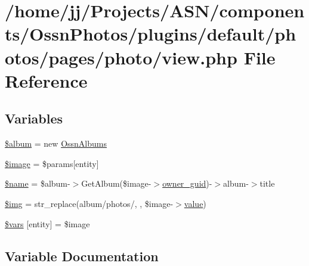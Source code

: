 \hypertarget{components_2_ossn_photos_2plugins_2default_2photos_2pages_2photo_2view_8php}{}\section{/home/jj/\+Projects/\+A\+S\+N/components/\+Ossn\+Photos/plugins/default/photos/pages/photo/view.php File Reference}
\label{components_2_ossn_photos_2plugins_2default_2photos_2pages_2photo_2view_8php}
\subsection*{Variables}
\begin{DoxyCompactItemize}
\item 
\hyperlink{components_2_ossn_photos_2plugins_2default_2photos_2pages_2photo_2view_8php_ac40a9764673b6d86593dc674331c5116}{\$album} = new \hyperlink{class_ossn_albums}{Ossn\+Albums}
\item 
\hyperlink{components_2_ossn_photos_2plugins_2default_2photos_2pages_2photo_2view_8php_aac6146b4cdec66c94263ddb55afd5946}{\$image} = \$params\mbox{[}\textquotesingle{}entity\textquotesingle{}\mbox{]}
\item 
\hyperlink{components_2_ossn_photos_2plugins_2default_2photos_2pages_2photo_2view_8php_ab2fc40d43824ea3e1ce5d86dee0d763b}{\$name} = \$album-\/$>$Get\+Album(\$image-\/$>$\hyperlink{user_8php_a307051fefc937afd02c509c55646f50b}{owner\+\_\+guid})-\/$>$album-\/$>$title
\item 
\hyperlink{components_2_ossn_photos_2plugins_2default_2photos_2pages_2photo_2view_8php_a56a9a0da0c26b3d3029cea47a6b9292f}{\$img} = str\+\_\+replace(\textquotesingle{}album/photos/\textquotesingle{}, \textquotesingle{}\textquotesingle{}, \$image-\/$>$\hyperlink{fullpage_2plugin_8min_8js_ac56c57897e10f699d124e0103921aa20}{value})
\item 
\hyperlink{components_2_ossn_photos_2plugins_2default_2photos_2pages_2photo_2view_8php_aa07d093940e8b3330058e9f2c4396426}{\$vars} \mbox{[}\textquotesingle{}entity\textquotesingle{}\mbox{]} = \$image
\end{DoxyCompactItemize}


\subsection{Variable Documentation}
